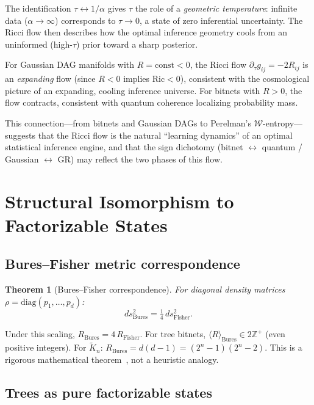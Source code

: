 \documentclass[11pt]{article}
\newtheorem{theorem}{Theorem}[section]
\theoremstyle{definition}
\begin{document}
The identification $\tau \leftrightarrow 1/\alpha$ gives $\tau$ the role 
of a \emph{geometric temperature}: infinite data ($\alpha\to\infty$) 
corresponds to $\tau\to 0$, a state of zero inferential uncertainty.  
The Ricci flow then describes how the optimal inference geometry cools 
from an uninformed (high-$\tau$) prior toward a sharp posterior.

For Gaussian DAG manifolds with $R = \mathrm{const} < 0$, 
the Ricci flow $\partial_\tau g_{ij} = -2R_{ij}$ is an 
\emph{expanding} flow (since $R<0$ implies $\mathrm{Ric} < 0$), 
consistent with the cosmological picture of an expanding, cooling 
inference universe.  For bitnets with $R > 0$, the flow contracts, 
consistent with quantum coherence localizing probability mass.

This connection—from bitnets and Gaussian DAGs to Perelman's 
$\mathcal{W}$-entropy—suggests that the Ricci flow is the natural 
``learning dynamics'' of an optimal statistical inference engine, 
and that the sign dichotomy (bitnet $\leftrightarrow$ quantum / 
Gaussian $\leftrightarrow$ GR) may reflect the two phases of this flow.

\section{Structural Isomorphism to Factorizable States}\label{sec:quantum}

\subsection{Bures--Fisher metric correspondence}

\begin{theorem}[Bures--Fisher correspondence]\label{thm:bures_fisher}
For diagonal density matrices $\rho = \mathrm{diag}(p_1,\ldots,p_d)$:
\[
  ds^2_{\mathrm{Bures}} = \tfrac{1}{4}\,ds^2_{\mathrm{Fisher}}.
\]
\end{theorem}

Under this scaling, $R_{\mathrm{Bures}} = 4\,R_{\mathrm{Fisher}}$.  
For tree bitnets, $\langle R\rangle_{\mathrm{Bures}} \in 2\mathbb{Z}^+$ 
(even positive integers).  For $\tilde{K}_n$: 
$R_{\mathrm{Bures}} = d(d-1) = (2^n-1)(2^n-2)$.
This is a rigorous mathematical theorem~\cite{Uhl92}, not a heuristic analogy.

\subsection{Trees as pure factorizable states}
\end{document}
